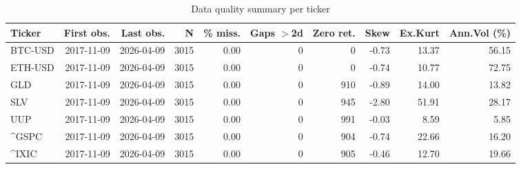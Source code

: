 \begin{table}[H]
\centering
\small
\caption{Data quality summary per ticker}
\label{tab:data_quality}
\begin{tabular}{lrrrrrrrrr}
\toprule
Ticker & First obs. & Last obs. & N & \% miss. & Gaps $>$2d & Zero ret. & Skew & Ex.Kurt & Ann.Vol (\%) \\
\midrule
BTC-USD & 2017-11-09 & 2026-04-09 & 3015 & 0.00 & 0 & 0 & -0.73 & 13.37 & 56.15 \\
ETH-USD & 2017-11-09 & 2026-04-09 & 3015 & 0.00 & 0 & 0 & -0.74 & 10.77 & 72.75 \\
GLD & 2017-11-09 & 2026-04-09 & 3015 & 0.00 & 0 & 910 & -0.89 & 14.00 & 13.82 \\
SLV & 2017-11-09 & 2026-04-09 & 3015 & 0.00 & 0 & 945 & -2.80 & 51.91 & 28.17 \\
UUP & 2017-11-09 & 2026-04-09 & 3015 & 0.00 & 0 & 991 & -0.03 & 8.59 & 5.85 \\
^GSPC & 2017-11-09 & 2026-04-09 & 3015 & 0.00 & 0 & 904 & -0.74 & 22.66 & 16.20 \\
^IXIC & 2017-11-09 & 2026-04-09 & 3015 & 0.00 & 0 & 905 & -0.46 & 12.70 & 19.66 \\
\bottomrule
\end{tabular}
\end{table}